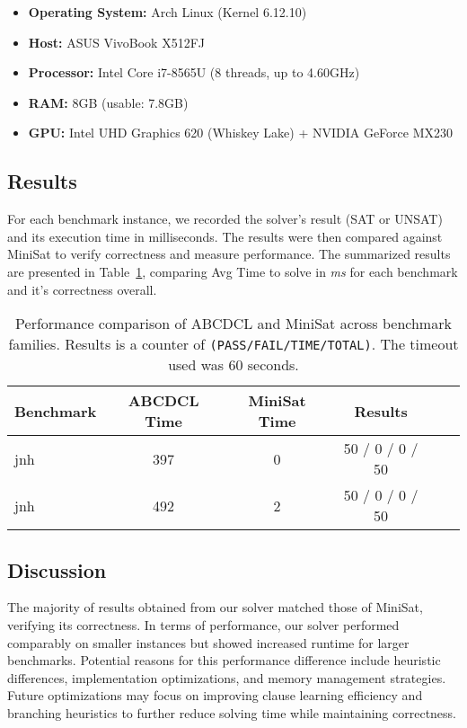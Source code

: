 \documentclass[a4paper,12pt]{article}
\begin{document}
\begin{itemize}
    \item \textbf{Operating System:} Arch Linux (Kernel 6.12.10)
    \item \textbf{Host:} ASUS VivoBook X512FJ
    \item \textbf{Processor:} Intel Core i7-8565U (8 threads, up to 4.60GHz)
    \item \textbf{RAM:} 8GB (usable: 7.8GB)
    \item \textbf{GPU:} Intel UHD Graphics 620 (Whiskey Lake) + NVIDIA GeForce MX230
\end{itemize}

\subsection{Results}
For each benchmark instance, we recorded the solver’s result (SAT or UNSAT) and its
execution time in milliseconds. The results were then compared against MiniSat to
verify correctness and measure performance. The summarized results are presented in
Table~\ref{tab:results}, comparing Avg Time to solve in \textit{ms} for each benchmark
and it's correctness overall.

\begin{table}[h]
    \centering
    \begin{tabular}{|l|c|c|c|c|c|}
        \hline
        \textbf{Benchmark} & \textbf{ABCDCL Time} & \textbf{MiniSat Time} & \textbf{Results } \\
        \hline
        jnh                & 397                  & 0                     & 50 / 0 / 0 / 50   \\
        jnh                & 492                  & 2                     & 50 / 0 / 0 / 50   \\

        \hline
    \end{tabular}
    \caption{Performance comparison of ABCDCL and MiniSat across benchmark families. Results is a
        counter of \texttt{(PASS/FAIL/TIME/TOTAL)}. The timeout used was $60$ seconds.}
    \label{tab:results}
\end{table}



\subsection{Discussion}
The majority of results obtained from our solver matched those of MiniSat, verifying its correctness.
In terms of performance, our solver performed comparably on smaller instances but showed increased
runtime for larger benchmarks. Potential reasons for this performance difference include heuristic
differences, implementation optimizations, and memory management strategies.
Future optimizations may focus on improving clause learning efficiency and branching heuristics to
further reduce solving time while maintaining correctness.
\end{document}
